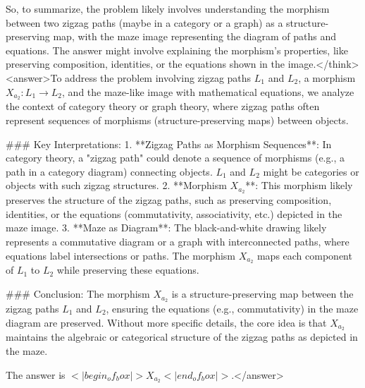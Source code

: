 So, to summarize, the problem likely involves understanding the morphism between two zigzag paths (maybe in a category or a graph) as a structure-preserving map, with the maze image representing the diagram of paths and equations. The answer might involve explaining the morphism's properties, like preserving composition, identities, or the equations shown in the image.</think><answer>To address the problem involving zigzag paths \( L_1 \) and \( L_2 \), a morphism \( X_{a_2}: L_1 \to L_2 \), and the maze-like image with mathematical equations, we analyze the context of category theory or graph theory, where zigzag paths often represent sequences of morphisms (structure-preserving maps) between objects.  

### Key Interpretations:  
1. **Zigzag Paths as Morphism Sequences**: In category theory, a "zigzag path" could denote a sequence of morphisms (e.g., a path in a category diagram) connecting objects. \( L_1 \) and \( L_2 \) might be categories or objects with such zigzag structures.  
2. **Morphism \( X_{a_2} \)**: This morphism likely preserves the structure of the zigzag paths, such as preserving composition, identities, or the equations (commutativity, associativity, etc.) depicted in the maze image.  
3. **Maze as Diagram**: The black-and-white drawing likely represents a commutative diagram or a graph with interconnected paths, where equations label intersections or paths. The morphism \( X_{a_2} \) maps each component of \( L_1 \) to \( L_2 \) while preserving these equations.  

### Conclusion:  
The morphism \( X_{a_2} \) is a structure-preserving map between the zigzag paths \( L_1 \) and \( L_2 \), ensuring the equations (e.g., commutativity) in the maze diagram are preserved. Without more specific details, the core idea is that \( X_{a_2} \) maintains the algebraic or categorical structure of the zigzag paths as depicted in the maze.  

The answer is \(<|begin_of_box|>X_{a_2}<|end_of_box|>\).</answer>